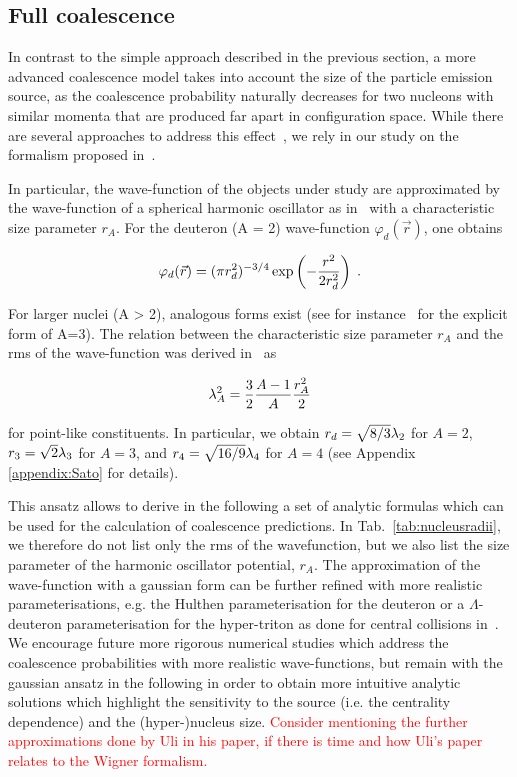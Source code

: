 \documentclass[a4paper,11pt]{scrartcl} %
\begin{document}
\subsection{Full coalescence}
\label{subsec:FullCoalescence}

In contrast to the simple approach described in the previous section, a more advanced coalescence model takes into account the size of the particle emission source, as the coalescence probability naturally decreases for two nucleons with similar momenta that are produced far apart in configuration space. While there are several approaches to address this effect~\cite{Sato:1981ez, Nagle:1996vp, Bergstrom:1979gpv, PapersWithWignerCitedinUli}, we rely in our study on the formalism proposed in~\cite{Scheibl:1998tk}. 

In particular, the wave-function of the objects under study are approximated by the wave-function of a spherical harmonic oscillator as in~\cite{Scheibl:1998tk} with a characteristic size parameter $r_{A}$. For the deuteron (A = 2) wave-function $\varphi_{d}(\vec{r}) $, one obtains

\begin{equation}\label{eq:WaveHeinz}
 \varphi_{d}(\vec{r}) = (\pi r_{d}^2)^{-3/4} \exp\left(-{r^2 \over 2 r_{d}^2}\right) \;.
\end{equation}

\noindent For larger nuclei (A > 2), analogous forms exist (see for instance~\cite{Scheibl:1998tk} for the explicit form of A=3). The relation between the characteristic size parameter $r_{A}$ and the rms of the wave-function was derived in~\cite{Shebeko:2006ud} as

\begin{equation}
 \lambda_{A}^2 = {3 \over 2}{A - 1 \over A} {r_{A}^2 \over 2}
\end{equation}

\noindent for point-like constituents. In particular, we obtain $r_{d}= \sqrt{8/3}  \lambda_{2}$ for $A = 2$, $r_{3}= \sqrt{2}{\lambda_{3}}$ for $A = 3$, and  $r_{4}= \sqrt{16/9} \lambda_{4}$ for $A=4$ (see Appendix \ref{appendix:Sato} for details).

This ansatz allows to derive in the following a set of analytic formulas which can be used for the calculation of coalescence predictions. In Tab.~\ref{tab:nucleusradii}, we therefore do not list only the rms of the wavefunction, but we also list the size parameter of the harmonic oscillator potential, $r_{A}$. The approximation of the wave-function with a gaussian form can be further refined with more realistic parameterisations, e.g. the Hulthen parameterisation for the deuteron or a $\Lambda$-deuteron parameterisation for the hyper-triton as done for central collisions in~\cite{Zhang:2018euf}. We encourage future more rigorous numerical studies which address the coalescence probabilities with more realistic wave-functions, but remain with the gaussian ansatz in the following in order to obtain more intuitive analytic solutions which highlight the sensitivity to the source (i.e. the centrality dependence) and the (hyper-)nucleus size. \textcolor{red}{Consider mentioning the further  approximations done by Uli in his paper, if there is time and how Uli's paper relates to the Wigner formalism.}
\end{document}
